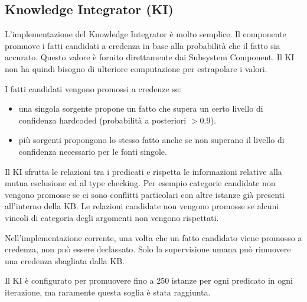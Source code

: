 \subsection{Knowledge Integrator (KI)}
L'implementazione del Knowledge Integrator è molto semplice. Il componente promuove i fatti candidati a credenza in base alla probabilità che il fatto sia accurato. Questo valore è fornito direttamente dai Subsystem Component. Il KI non ha quindi bisogno di ulteriore computazione per estrapolare i valori.

\noindent I fatti candidati vengono promossi a credenze se:
\begin{itemize}
	\item una singola sorgente propone un fatto che supera un certo livello di confidenza hardcoded (probabilità a posteriori $> 0.9$).
	\item più sorgenti propongono lo stesso fatto anche se non superano il livello di confidenza necessario per le fonti singole.
\end{itemize}
Il KI sfrutta le relazioni tra i predicati e rispetta le informazioni relative alla mutua esclusione ed al type checking. Per esempio categorie candidate non vengono promosse se ci sono conflitti particolari con altre istanze già presenti all'interno della KB.
Le relazioni candidate non vengono promosse se alcuni vincoli di categoria degli argomenti non vengono rispettati.

\noindent Nell'implementazione corrente, una volta che un fatto candidato viene promosso a credenza, non può essere declassato. Solo la supervisione umana può rimuovere una credenza sbagliata dalla KB.

\noindent Il KI è configurato per promuovere fino a 250 istanze per ogni predicato in ogni iterazione, ma raramente questa soglia è stata raggiunta.
\newpage